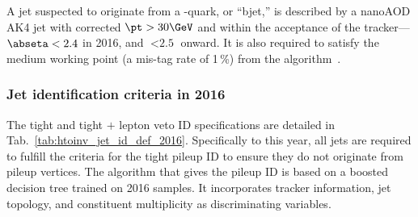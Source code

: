 A \gls{jet} suspected to originate from a \Pbottom-quark, or ``\gls{bjet},'' is described by a nanoAOD AK4 \gls{jet} with corrected $\pt > \text{30}\GeV$ and within the acceptance of the tracker---$\abseta < \text{2.4}$ in 2016, and $< \text{2.5}$ onward. It is also required to satisfy the medium working point (a mis-tag rate of 1\,\%) from the \deepcsv algorithm~\cite{Sirunyan:2017ezt}.




\subsubsection{Jet identification criteria in 2016}
\label{subsubsec:objects_jets_2016}

The tight and tight $+$ lepton veto ID specifications are detailed in Tab.~\ref{tab:htoinv_jet_id_def_2016}. Specifically to this year, all \glspl{jet} are required to fulfill the criteria for the tight pileup ID to ensure they do not originate from pileup vertices. The algorithm that gives the pileup ID is based on a boosted decision tree trained on 2016 samples. It incorporates tracker information, jet topology, and constituent multiplicity as discriminating variables.


